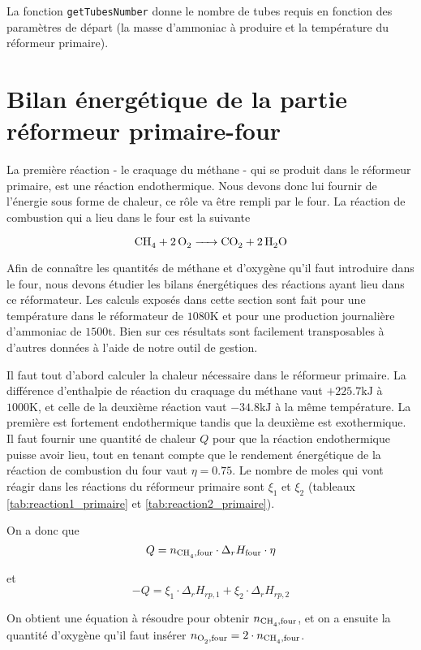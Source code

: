 \documentclass[a4paper, oneside, 12pt]{article}
\begin{document}
La fonction \texttt{getTubesNumber} donne le
nombre de tubes requis en fonction des paramètres de départ (la masse d'ammoniac 
à produire et la température du réformeur primaire).

\section{Bilan énergétique de la partie réformeur primaire-four}

La première réaction - le craquage du méthane - qui se produit dans le réformeur primaire,
est une réaction endothermique. Nous devons donc lui fournir de l'énergie sous 
forme de chaleur, ce r\^ole va être rempli par le four. 
La réaction de combustion qui a lieu dans le four est la suivante

\[
	\ce{CH4 + 2O2 -> CO2 + 2H2O}
\]

Afin de connaître les quantités de méthane et d'oxygène qu'il faut
introduire dans le four, nous devons étudier les bilans énergétiques
des réactions ayant lieu dans ce réformateur. Les calculs exposés dans cette section 
sont fait pour une température dans le réformateur de $1080 \si{\kelvin}$
et pour une production journalière d'ammoniac de $1500 \si{\tonne}$. 
Bien sur ces résultats sont facilement transposables
à d'autres données à l'aide de notre outil de gestion.

Il faut tout d'abord calculer la chaleur nécessaire dans le réformeur primaire.
La différence d'enthalpie de réaction du craquage du méthane vaut $+225.7 \si{\kilo\joule}$
à $1000 \si{\kelvin}$, et celle de la deuxième réaction
vaut $-34.8 \si{\kilo\joule}$ à la même température.
La première est fortement endothermique tandis que la deuxième est exothermique.
Il faut fournir une quantité de chaleur $Q$ pour que la réaction endothermique
puisse avoir lieu, tout en tenant compte que le rendement énergétique de 
la réaction de combustion du four vaut $\eta = 0.75$.
Le nombre de moles qui vont réagir dans les réactions du réformeur primaire 
sont $\xi_1$ et $\xi_2$ (tableaux \ref{tab:reaction1_primaire} 
et \ref{tab:reaction2_primaire}).

On a donc que 
\[
	Q = n_{\ce{CH4},\text{four}} \cdot \Delta_r H_{\text{four}} \cdot \eta
\]

et 
\[
	-Q = \xi_1 \cdot \Delta_r H_{rp,1} + \xi_2 \cdot \Delta_r H_{rp,2}
\]

On obtient une équation à résoudre pour obtenir $n_{\ce{CH4},\text{four}}$, et on a ensuite
la quantité d'oxygène qu'il faut insérer $n_{\ce{O2},\text{four}} = 2 \cdot n_{\ce{CH4},\text{four}}$.
\end{document}
